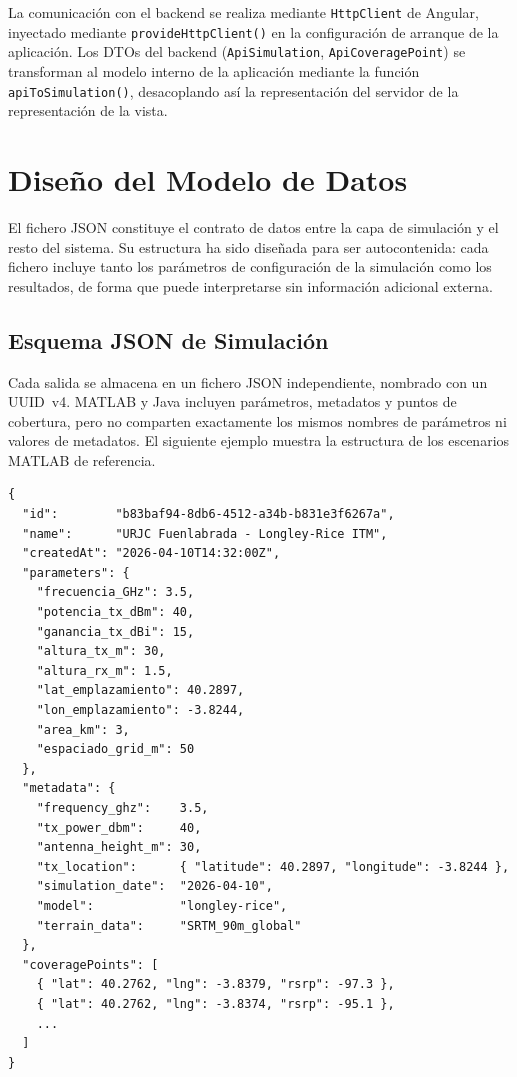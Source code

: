 La comunicación con el backend se realiza mediante \lstinline{HttpClient} de Angular,
inyectado mediante \lstinline{provideHttpClient()} en la configuración de arranque de la
aplicación. Los DTOs del backend (\lstinline{ApiSimulation}, \lstinline{ApiCoveragePoint})
se transforman al modelo interno de la aplicación mediante la función
\lstinline{apiToSimulation()}, desacoplando así la representación del servidor de la
representación de la vista.

\section{Diseño del Modelo de Datos}
\label{sec:datos}

El fichero JSON constituye el contrato de datos entre la capa de simulación y el resto del
sistema. Su estructura ha sido diseñada para ser autocontenida: cada fichero incluye tanto
los parámetros de configuración de la simulación como los resultados, de forma que puede
interpretarse sin información adicional externa.

\subsection{Esquema JSON de Simulación}
\label{subsec:esquema_json}

Cada salida se almacena en un fichero JSON independiente, nombrado con un UUID~v4. MATLAB
y Java incluyen parámetros, metadatos y puntos de cobertura, pero no comparten exactamente
los mismos nombres de parámetros ni valores de metadatos. El siguiente ejemplo muestra la
estructura de los escenarios MATLAB de referencia.

\begin{lstlisting}[caption={Estructura del fichero JSON de simulación.},
  label={cod:json_schema}, basicstyle={\footnotesize\ttfamily}]
{
  "id":        "b83baf94-8db6-4512-a34b-b831e3f6267a",
  "name":      "URJC Fuenlabrada - Longley-Rice ITM",
  "createdAt": "2026-04-10T14:32:00Z",
  "parameters": {
    "frecuencia_GHz": 3.5,
    "potencia_tx_dBm": 40,
    "ganancia_tx_dBi": 15,
    "altura_tx_m": 30,
    "altura_rx_m": 1.5,
    "lat_emplazamiento": 40.2897,
    "lon_emplazamiento": -3.8244,
    "area_km": 3,
    "espaciado_grid_m": 50
  },
  "metadata": {
    "frequency_ghz":    3.5,
    "tx_power_dbm":     40,
    "antenna_height_m": 30,
    "tx_location":      { "latitude": 40.2897, "longitude": -3.8244 },
    "simulation_date":  "2026-04-10",
    "model":            "longley-rice",
    "terrain_data":     "SRTM_90m_global"
  },
  "coveragePoints": [
    { "lat": 40.2762, "lng": -3.8379, "rsrp": -97.3 },
    { "lat": 40.2762, "lng": -3.8374, "rsrp": -95.1 },
    ...
  ]
}
\end{lstlisting}

